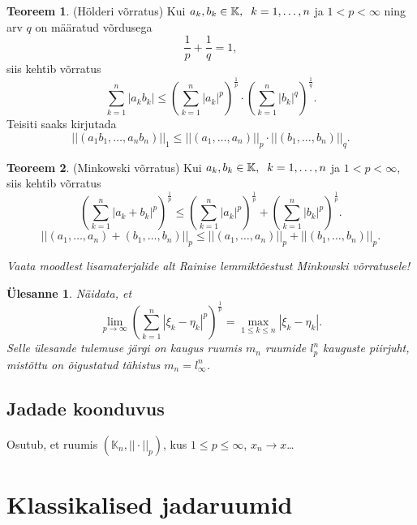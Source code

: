 \documentclass{article}[12pt]
\newcommand{\h}{\hspace{0.2cm}}
\newcommand{\K}{\mathbb{K}}
\newcommand{\norm}[1]{||#1||}
\newtheorem{yl}{Ülesanne}[section]
\theoremstyle{definition}
\theoremstyle{definition}
\newtheorem{theorem}{Teoreem}[section]
\theoremstyle{definition}
\theoremstyle{break}
\begin{document}
\begin{theorem}
	(Hölderi võrratus) Kui $a_k,b_k\in \K,\h k=1,\dots,n$ ja $1<p<\infty$ ning arv $q$ on määratud võrdusega
	\[
		\frac{1}{p} + \frac{1}{q} = 1,
	\]
	siis kehtib võrratus
	\[
		\sum_{k=1}^n |a_k b_k| \leq \left( \sum_{k=1}^n |a_k|^p \right)^{\frac{1}{p}} \cdot \left( \sum_{k=1}^n |b_k|^q \right)^{\frac{1}{q}}.
	\]
	Teisiti saaks kirjutada
	\[
		\norm{(a_1b_1,\dots,a_nb_n)}_1 \leq \norm{(a_1,\dots,a_n)}_p \cdot \norm{(b_1,\dots,b_n)}_q.
	\]
\end{theorem}
\begin{theorem}
	(Minkowski võrratus) Kui $a_k,b_k\in \K,\h k=1,\dots,n$ ja $1<p<\infty$, siis kehtib võrratus
	\[
		\left( \sum_{k=1}^n |a_k + b_k|^p \right)^{\frac{1}{p}} \leq \left( \sum_{k=1}^n |a_k|^p \right)^{\frac{1}{p}} + \left( \sum_{k=1}^n |b_k|^p \right)^{\frac{1}{p}}.
	\]
	\[
		\norm{(a_1,\dots,a_n) + (b_1,\dots,b_n)}_p \leq \norm{(a_1,\dots,a_n)}_p + \norm{(b_1,\dots,b_n)}_p.
	\]
\end{theorem}

\textit{Vaata moodlest lisamaterjalide alt Rainise lemmiktõestust Minkowski võrratusele!}

\begin{yl}
	Näidata, et
	\[
		\lim_{p\rightarrow \infty} \left( \sum_{k=1}^n |\xi_k-\eta_k|^p \right)^{\frac{1}{p}} = \max_{1\leq k\leq n} |\xi_k - \eta_k|.
	\]
	Selle ülesande tulemuse järgi on kaugus ruumis $m_n$ ruumide $l_p^n$ kauguste piirjuht, mistõttu on õigustatud tähistus $m_n = l_\infty^n$.
\end{yl}

\subsection{Jadade koonduvus}

Osutub, et ruumis $(\K_n, \norm{\cdot}_p)$, kus $1\leq p\leq \infty$, $x_n\rightarrow x$\dots

\section{Klassikalised jadaruumid}
\end{document}

